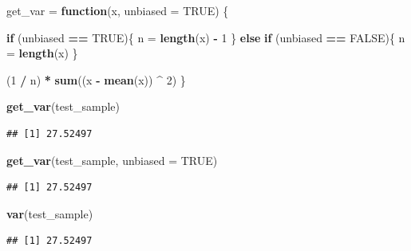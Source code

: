 \documentclass[]{book}
\newenvironment{Shaded}{\begin{snugshade}}{\end{snugshade}}
\newcommand{\KeywordTok}[1]{\textcolor[rgb]{0.13,0.29,0.53}{\textbf{#1}}}
\newcommand{\DataTypeTok}[1]{\textcolor[rgb]{0.13,0.29,0.53}{#1}}
\newcommand{\DecValTok}[1]{\textcolor[rgb]{0.00,0.00,0.81}{#1}}
\newcommand{\StringTok}[1]{\textcolor[rgb]{0.31,0.60,0.02}{#1}}
\newcommand{\OtherTok}[1]{\textcolor[rgb]{0.56,0.35,0.01}{#1}}
\newcommand{\ControlFlowTok}[1]{\textcolor[rgb]{0.13,0.29,0.53}{\textbf{#1}}}
\newcommand{\OperatorTok}[1]{\textcolor[rgb]{0.81,0.36,0.00}{\textbf{#1}}}
\newcommand{\NormalTok}[1]{#1}
\begin{document}
\begin{Shaded}
\begin{Highlighting}[]
\NormalTok{get_var =}\StringTok{ }\ControlFlowTok{function}\NormalTok{(x, }\DataTypeTok{unbiased =} \OtherTok{TRUE}\NormalTok{) \{}

  \ControlFlowTok{if}\NormalTok{ (unbiased }\OperatorTok{==}\StringTok{ }\OtherTok{TRUE}\NormalTok{)\{}
\NormalTok{    n =}\StringTok{ }\KeywordTok{length}\NormalTok{(x) }\OperatorTok{-}\StringTok{ }\DecValTok{1}
\NormalTok{  \} }\ControlFlowTok{else} \ControlFlowTok{if}\NormalTok{ (unbiased }\OperatorTok{==}\StringTok{ }\OtherTok{FALSE}\NormalTok{)\{}
\NormalTok{    n =}\StringTok{ }\KeywordTok{length}\NormalTok{(x) }
\NormalTok{   \}}

\NormalTok{  (}\DecValTok{1} \OperatorTok{/}\StringTok{ }\NormalTok{n) }\OperatorTok{*}\StringTok{ }\KeywordTok{sum}\NormalTok{((x }\OperatorTok{-}\StringTok{ }\KeywordTok{mean}\NormalTok{(x)) }\OperatorTok{^}\StringTok{ }\DecValTok{2}\NormalTok{)}
\NormalTok{\}}
\end{Highlighting}
\end{Shaded}

\begin{Shaded}
\begin{Highlighting}[]
\KeywordTok{get_var}\NormalTok{(test_sample)}
\end{Highlighting}
\end{Shaded}

\begin{verbatim}
## [1] 27.52497
\end{verbatim}

\begin{Shaded}
\begin{Highlighting}[]
\KeywordTok{get_var}\NormalTok{(test_sample, }\DataTypeTok{unbiased =} \OtherTok{TRUE}\NormalTok{)}
\end{Highlighting}
\end{Shaded}

\begin{verbatim}
## [1] 27.52497
\end{verbatim}

\begin{Shaded}
\begin{Highlighting}[]
\KeywordTok{var}\NormalTok{(test_sample)}
\end{Highlighting}
\end{Shaded}

\begin{verbatim}
## [1] 27.52497
\end{verbatim}
\end{document}
